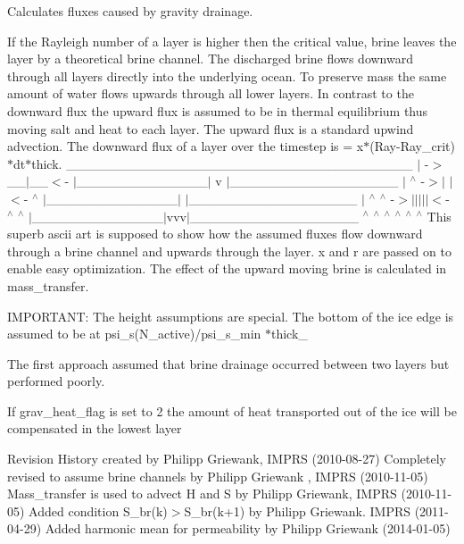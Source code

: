 Calculates fluxes caused by gravity drainage. 

If the Rayleigh number of a layer is higher then the critical value, brine leaves the layer by a theoretical brine channel. The discharged brine flows downward through all layers directly into the underlying ocean. To preserve mass the same amount of water flows upwards through all lower layers. In contrast to the downward flux the upward flux is assumed to be in thermal equilibrium thus moving salt and heat to each layer. The upward flux is a standard upwind advection. The downward flux of a layer over the timestep is = x$\ast$(Ray-\/Ray\_\-crit)$\ast$dt$\ast$thick. \_\-\_\-\_\-\_\-\_\-\_\-\_\-\_\-\_\-\_\-\_\-\_\-\_\-\_\-\_\-\_\-\_\-\_\-\_\-\_\-\_\-\_\-\_\-\_\-\_\-\_\-\_\-\_\-\_\-\_\-\_\-\_\-\_\-\_\-\_\-\_\-\_\- $|$ -\/$>$\_\-\_\-$|$\_\-\_\-$<$-\/ $|$\_\-\_\-\_\-\_\-\_\-\_\-\_\-\_\-\_\-\_\-\_\-\_\-\_\-\_\-$|$ v $|$\_\-\_\-\_\-\_\-\_\-\_\-\_\-\_\-\_\-\_\-\_\-\_\-\_\-\_\-\_\-\_\-\_\-\_\- $|$ $^\wedge$ -\/$>$$|$ $|$$<$-\/ $^\wedge$ $|$\_\-\_\-\_\-\_\-\_\-\_\-\_\-\_\-\_\-\_\-\_\-\_\-\_\-\_\-$|$ $|$\_\-\_\-\_\-\_\-\_\-\_\-\_\-\_\-\_\-\_\-\_\-\_\-\_\-\_\-\_\-\_\-\_\-\_\- $|$ $^\wedge$ $^\wedge$ -\/$>$$|$$|$$|$$|$$|$$<$-\/ $^\wedge$ $^\wedge$ $|$\_\-\_\-\_\-\_\-\_\-\_\-\_\-\_\-\_\-\_\-\_\-\_\-\_\-\_\-$|$vvv$|$\_\-\_\-\_\-\_\-\_\-\_\-\_\-\_\-\_\-\_\-\_\-\_\-\_\-\_\-\_\-\_\-\_\-\_\- $^\wedge$ $^\wedge$ $^\wedge$ $^\wedge$ $^\wedge$ $^\wedge$ This superb ascii art is supposed to show how the assumed fluxes flow downward through a brine channel and upwards through the layer. x and r are passed on to enable easy optimization. The effect of the upward moving brine is calculated in mass\_\-transfer.

IMPORTANT: The height assumptions are special. The bottom of the ice edge is assumed to be at psi\_\-s(N\_\-active)/psi\_\-s\_\-min $\ast$thick\_

The first approach assumed that brine drainage occurred between two layers but performed poorly.

If grav\_\-heat\_\-flag is set to 2 the amount of heat transported out of the ice will be compensated in the lowest layer

\begin{DoxyParagraph}{Revision History}
created by Philipp Griewank, IMPRS (2010-\/08-\/27) Completely revised to assume brine channels by Philipp Griewank , IMPRS (2010-\/11-\/05) Mass\_\-transfer is used to advect H and S by Philipp Griewank, IMPRS (2010-\/11-\/05) Added condition S\_\-br(k)$>$S\_\-br(k+1) by Philipp Griewank. IMPRS (2011-\/04-\/29) Added harmonic mean for permeability by Philipp Griewank (2014-\/01-\/05) 
\end{DoxyParagraph}

